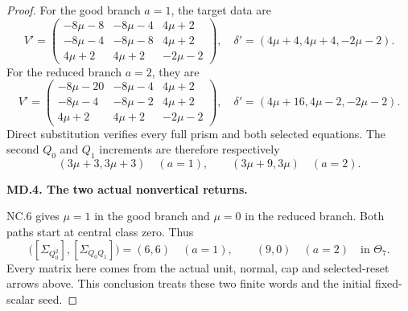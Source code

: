 \begin{proof}
For the good branch \(a=1\), the target data are
\[
 V'=\begin{pmatrix}
 -8\mu-8&-8\mu-4&4\mu+2\\
 -8\mu-4&-8\mu-8&4\mu+2\\
 4\mu+2&4\mu+2&-2\mu-2
 \end{pmatrix},\quad
 \delta'=(4\mu+4,4\mu+4,-2\mu-2).
\]
For the reduced branch \(a=2\), they are
\[
 V'=\begin{pmatrix}
 -8\mu-20&-8\mu-4&4\mu+2\\
 -8\mu-4&-8\mu-2&4\mu+2\\
 4\mu+2&4\mu+2&-2\mu-2
 \end{pmatrix},\quad
 \delta'=(4\mu+16,4\mu-2,-2\mu-2).
\]
Direct substitution verifies every full prism and both selected equations. The second \(Q_0\) and \(Q_1\) increments are therefore respectively
\[
 (3\mu+3,3\mu+3)\quad(a=1),\qquad
 (3\mu+9,3\mu)\quad(a=2).
\]

\par\medskip\noindent\textbf{MD.4. The two actual nonvertical returns.}\par\nopagebreak[4]

NC.6 gives \(\mu=1\) in the good branch and \(\mu=0\) in the reduced branch. Both paths start at central class zero. Thus
\[
 \bigl([\Sigma_{Q_0^2}],[\Sigma_{Q_0Q_1}]\bigr)
 =(6,6)\quad(a=1),\qquad (9,0)\quad(a=2)
 \quad\text{in }\Theta_7.
\]
Every matrix here comes from the actual unit, normal, cap and selected-reset arrows above. This conclusion treats these two finite words and the initial fixed-scalar seed.

\end{proof}

